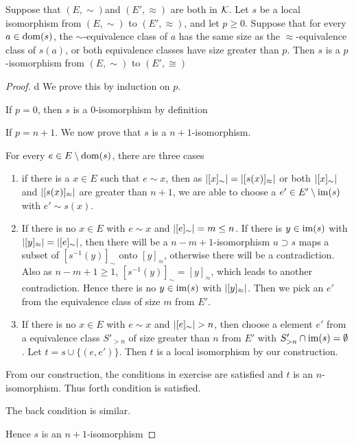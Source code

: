 \documentclass[11pt]{article}
\begin{document}
\begin{exercise}
\label{ex5}
Suppose that \((E,\sim)\)and \((E',\approx)\) are both in \(\mathcal{K}\). Let \(s\) be a local isomorphism
from \((E,\sim)\) to \((E',\approx)\), and let \(p\ge 0\). Suppose that for every \(a\in\operatorname{dom}(s)\),
the \(\sim\)-equivalence class of \(a\) has the same size as the \(\approx\)-equivalence class of \(s(a)\),
or both equivalence classes have size greater than \(p\). Then \(s\) is a \(p\)-isomorphism
from \((E,\sim)\) to \((E',\cong)\)
\end{exercise}

\begin{proof}
d
We prove this by induction on \(p\).

If \(p=0\), then \(s\) is a 0-isomorphism by definition

If \(p=n+1\). We now prove that \(s\) is a \(n+1\)-isomorphism.

For every \(e\in E\setminus\operatorname{dom}(s)\), there are three cases
\begin{enumerate}
\item if there is a \(x\in E\) such that \(e\sim x\), then as \(\abs{[x]_\sim}=\abs{[s(x)]_\approx}\) or
both \(\abs{[x]_\sim}\) and \(\abs{[s(x)]_\approx}\) are greater than \(n+1\), we are able to choose
a \(e'\in E'\setminus\operatorname{im}(s)\) with \(e'\sim s(x)\).

\item If there is no \(x\in E\) with \(e\sim x\) and \(\abs{[e]_\sim}=m\le n\). If there is \(y\in\operatorname{im}(s)\)
with \(\abs{[y]_\approx}=\abs{[e]_\sim}\), then there will be a \(n-m+1\)-isomorphism \(u\supset s\)
maps a subset of \([s^{-1}(y)]_\sim\) onto \([y]_\approx\), otherwise there will be a contradiction. Also
as \(n-m+1\ge 1\), \([s^{-1}(y)]_\sim=[y]_\approx\),
which leads to another contradiction. Hence there is no \(y\in\operatorname{im}(s)\) with \(\abs{[y]_\approx}\). Then we pick
an \(e'\) from the equivalence class of size \(m\) from \(E'\).

\item If there is no \(x\in E\) with \(e\sim x\) and \(\abs{[e]_\sim}>n\), then choose a element \(e'\) from a
equivalence class \(S'_{>n}\) of size greater than \(n\)
from \(E'\) with \(S_{>n}'\cap\operatorname{im}(s)=\emptyset\).  Let \(t=s\cup\{(e,e')\}\). Then \(t\) is a local
isomorphism by our construction.
\end{enumerate}

From our construction, the conditions in exercise are satisfied and \(t\) is an \(n\)-isomorphism.
Thus forth condition is satisfied.

The back condition is similar.

Hence \(s\) is an \(n+1\)-isomorphism
\end{proof}
\end{document}
